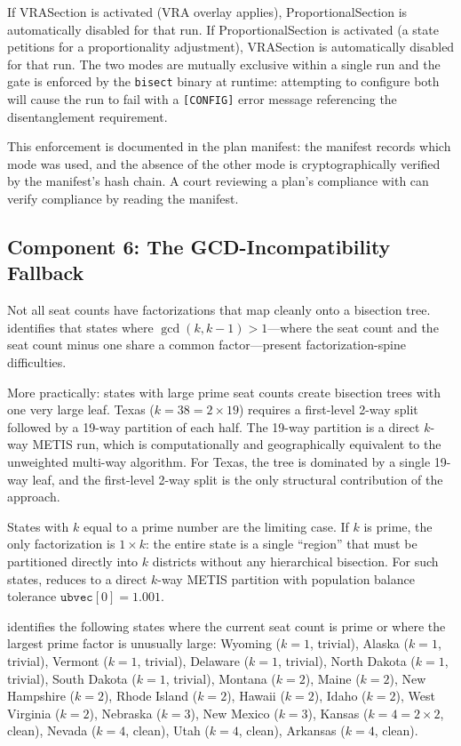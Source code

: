 If VRASection is activated (VRA overlay applies), ProportionalSection is
automatically disabled for that run.
If ProportionalSection is activated (a state petitions for a proportionality
adjustment), VRASection is automatically disabled for that run.
The two modes are mutually exclusive within a single run and the gate is enforced
by the \texttt{bisect} binary at runtime: attempting to configure both will cause
the run to fail with a \texttt{[CONFIG]} error message referencing the
\callais{} disentanglement requirement.

This enforcement is documented in the plan manifest: the manifest records
which mode was used, and the absence of the other mode is cryptographically
verified by the manifest's hash chain.
A court reviewing a plan's compliance with \callais{} can verify compliance
by reading the manifest.

\subsection{Component 6: The GCD-Incompatibility Fallback}

Not all seat counts have factorizations that map cleanly onto a \hh{} bisection
tree.
\citet{b13paper} identifies that states where $\gcd(k, k-1) > 1$---where
the seat count and the seat count minus one share a common factor---present
factorization-spine difficulties.

More practically: states with large prime seat counts create bisection trees
with one very large leaf.
Texas ($k = 38 = 2 \times 19$) requires a first-level 2-way split followed
by a 19-way partition of each half.
The 19-way partition is a direct $k$-way METIS run, which is computationally
and geographically equivalent to the unweighted multi-way algorithm.
For Texas, the \hh{} tree is dominated by a single 19-way leaf, and the
first-level 2-way split is the only structural contribution of the \ar{} approach.

States with $k$ equal to a prime number are the limiting case.
If $k$ is prime, the only factorization is $1 \times k$: the entire state
is a single ``region'' that must be partitioned directly into $k$ districts
without any hierarchical bisection.
For such states, \ar{} reduces to a direct $k$-way METIS partition with
population balance tolerance $\texttt{ubvec}[0] = 1.001$.

\citet{b13paper} identifies the following states where the current seat count
is prime or where the largest prime factor is unusually large:
Wyoming ($k=1$, trivial), Alaska ($k=1$, trivial), Vermont ($k=1$, trivial),
Delaware ($k=1$, trivial), North Dakota ($k=1$, trivial), South Dakota ($k=1$,
trivial), Montana ($k=2$), Maine ($k=2$), New Hampshire ($k=2$),
Rhode Island ($k=2$), Hawaii ($k=2$), Idaho ($k=2$), West Virginia ($k=2$),
Nebraska ($k=3$), New Mexico ($k=3$), Kansas ($k=4 = 2 \times 2$, clean),
Nevada ($k=4$, clean), Utah ($k=4$, clean), Arkansas ($k=4$, clean).

